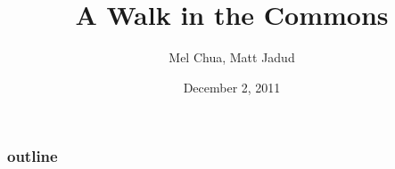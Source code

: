 \documentclass{beamer}
\title{A Walk in the Commons}
\author{Mel Chua, Matt Jadud}
\date{December 2, 2011}
\begin{document}
\titlepage

\begin{frame} 
\frametitle{outline}
\tableofcontents
\end{frame} 








\end{document}
